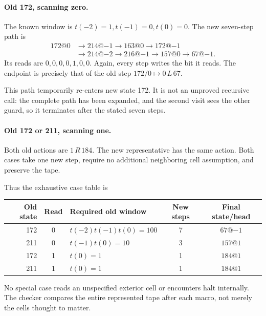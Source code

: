 \documentclass[11pt,letterpaper]{article}
\newcommand{\act}[3]{#1\,#2\,#3}
\begin{document}
\paragraph{Old 172, scanning zero.}
The known window is $t(-2)=1,t(-1)=0,t(0)=0$. The new seven-step path is
\begin{align*}
172@0&\longrightarrow214@{-1}\longrightarrow163@0
 \longrightarrow172@{-1}\\
 &\longrightarrow214@{-2}\longrightarrow216@{-1}
 \longrightarrow157@0\longrightarrow67@{-1}.
\end{align*}
Its reads are $0,0,0,0,1,0,0$. Again, every step writes the bit it reads.
The endpoint is precisely that of the old step
$172/0\mapsto\act0L{67}$.

This path temporarily re-enters new state 172. It is not an unproved
recursive call: the complete path has been expanded, and the second visit
sees the other guard, so it terminates after the stated seven steps.

\paragraph{Old 172 or 211, scanning one.}
Both old actions are $\act1R{184}$. The new representative has the same
action. Both cases take one new step, require no additional neighboring
cell assumption, and preserve the tape.

Thus the exhaustive case table is
\begin{center}
\begin{tabular}{@{}rclcc@{}}
\toprule
Old state & Read & Required old window & New steps & Final state/head\\
\midrule
172 & 0 & $t(-2)t(-1)t(0)=100$ & 7 & $67@{-1}$\\
211 & 0 & $t(-1)t(0)=10$ & 3 & $157@1$\\
172 & 1 & $t(0)=1$ & 1 & $184@1$\\
211 & 1 & $t(0)=1$ & 1 & $184@1$\\
\bottomrule
\end{tabular}
\end{center}
No special case reads an unspecified exterior cell or encounters halt
internally. The checker compares the entire represented tape after each
macro, not merely the cells thought to matter.
\end{document}
